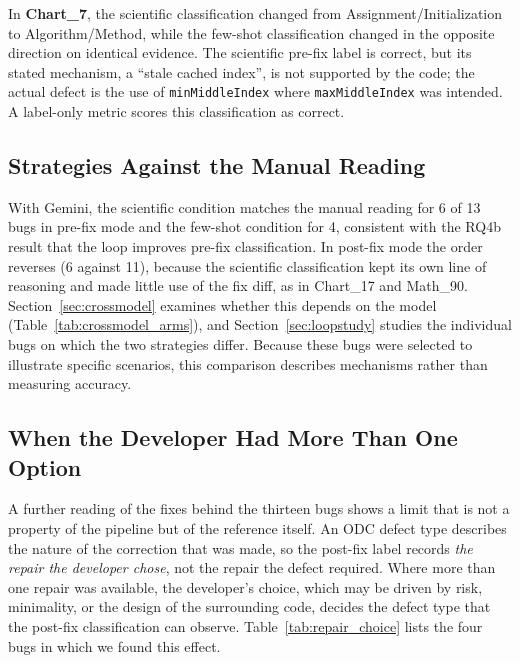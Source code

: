 \documentclass{iutbscthesis}
\begin{document}
In \textbf{Chart\_7}, the scientific classification changed from Assignment/\allowbreak Initialization to Algorithm/Method, while the few-shot classification changed in the opposite direction on identical evidence. The scientific pre-fix label is correct, but its stated mechanism, a ``stale cached index'', is not supported by the code; the actual defect is the use of \texttt{min\allowbreak Middle\allowbreak Index} where \texttt{max\allowbreak Middle\allowbreak Index} was intended. A label-only metric scores this classification as correct.

\subsection{Strategies Against the Manual Reading}
\label{sec:manual_strategies}

With Gemini, the scientific condition matches the manual reading for 6 of 13 bugs in pre-fix mode and the few-shot condition for 4, consistent with the RQ4b result that the loop improves pre-fix classification. In post-fix mode the order reverses (6 against 11), because the scientific classification kept its own line of reasoning and made little use of the fix diff, as in Chart\_17 and Math\_90. Section~\ref{sec:crossmodel} examines whether this depends on the model (Table~\ref{tab:crossmodel_arms}), and Section~\ref{sec:loopstudy} studies the individual bugs on which the two strategies differ. Because these bugs were selected to illustrate specific scenarios, this comparison describes mechanisms rather than measuring accuracy.

\subsection{When the Developer Had More Than One Option}
\label{sec:repair_choice}

A further reading of the fixes behind the thirteen bugs shows a limit that is not a property of the pipeline but of the reference itself. An ODC defect type describes the nature of the correction that was made, so the post-fix label records \emph{the repair the developer chose}, not the repair the defect required. Where more than one repair was available, the developer's choice, which may be driven by risk, minimality, or the design of the surrounding code, decides the defect type that the post-fix classification can observe. Table~\ref{tab:repair_choice} lists the four bugs in which we found this effect.
\end{document}
